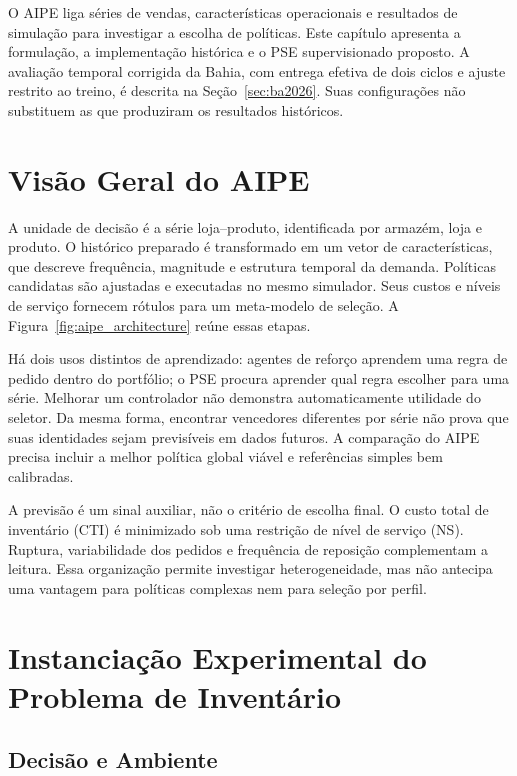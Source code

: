 
O AIPE liga séries de vendas, características operacionais e resultados de simulação para investigar a escolha de políticas. Este capítulo apresenta a formulação, a implementação histórica e o PSE supervisionado proposto. A avaliação temporal corrigida da Bahia, com entrega efetiva de dois ciclos e ajuste restrito ao treino, é descrita na Seção~\ref{sec:ba2026}. Suas configurações não substituem as que produziram os resultados históricos.

\section{Visão Geral do AIPE}
\label{sec:visao_geral_aipe}

A unidade de decisão é a série loja--produto, identificada por armazém, loja e produto. O histórico preparado é transformado em um vetor de características, que descreve frequência, magnitude e estrutura temporal da demanda. Políticas candidatas são ajustadas e executadas no mesmo simulador. Seus custos e níveis de serviço fornecem rótulos para um meta-modelo de seleção. A Figura~\ref{fig:aipe_architecture} reúne essas etapas.



Há dois usos distintos de aprendizado: agentes de reforço aprendem uma regra de pedido dentro do portfólio; o PSE procura aprender qual regra escolher para uma série. Melhorar um controlador não demonstra automaticamente utilidade do seletor. Da mesma forma, encontrar vencedores diferentes por série não prova que suas identidades sejam previsíveis em dados futuros. A comparação do AIPE precisa incluir a melhor política global viável e referências simples bem calibradas.

A previsão é um sinal auxiliar, não o critério de escolha final. O custo total de inventário (CTI) é minimizado sob uma restrição de nível de serviço (NS). Ruptura, variabilidade dos pedidos e frequência de reposição complementam a leitura. Essa organização permite investigar heterogeneidade, mas não antecipa uma vantagem para políticas complexas nem para seleção por perfil.

\section{Instanciação Experimental do Problema de Inventário}
\label{sec:formulacao}
\subsection{Decisão e Ambiente}
\label{sec:instanciacao_ambiente}


